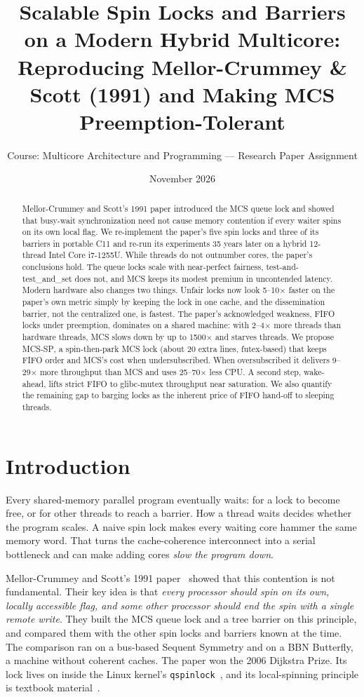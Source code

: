 \documentclass[10pt,twocolumn]{article}
\title{\vspace{-1.2em}\textbf{Scalable Spin Locks and Barriers on a Modern Hybrid Multicore:\\
Reproducing Mellor-Crummey \& Scott (1991) and Making MCS Preemption-Tolerant}\vspace{-0.4em}}
\author{Course: Multicore Architecture and Programming --- Research Paper Assignment}
\date{\vspace{-0.6em}November 2026\vspace{-0.8em}}
\newcommand{\mcssp}{\textsc{MCS-SP}}
\begin{document}
\maketitle

\begin{abstract}
\noindent
Mellor-Crummey and Scott's 1991 paper introduced the MCS queue lock and showed that busy-wait
synchronization need not cause memory contention if every waiter spins on its own local flag. We
re-implement the paper's five spin locks and three of its barriers in portable C11 and re-run its
experiments 35 years later on a hybrid 12-thread Intel Core i7-1255U. While threads do not outnumber
cores, the paper's conclusions hold. The queue locks scale with near-perfect fairness, test-and-test\_and\_set
does not, and MCS keeps its modest premium in uncontended latency. Modern hardware also changes two things.
Unfair locks now look 5--10$\times$ faster on the paper's own metric simply by keeping the lock in one
cache, and the dissemination barrier, not the centralized one, is fastest. The paper's acknowledged weakness,
FIFO locks under preemption, dominates on a shared machine: with 2--4$\times$ more threads than hardware threads, MCS
slows down by up to 1500$\times$ and starves threads. We propose \mcssp{}, a spin-then-park MCS lock
(about 20 extra lines, futex-based) that keeps FIFO order and MCS's cost when undersubscribed. When
oversubscribed it delivers 9--29$\times$ more throughput than MCS and uses 25--70$\times$ less CPU. A second
step, wake-ahead, lifts strict FIFO to glibc-mutex throughput near saturation. We also quantify the remaining gap
to barging locks as the inherent price of FIFO hand-off to sleeping threads.
\end{abstract}

\section{Introduction}
Every shared-memory parallel program eventually waits: for a lock to become free, or for
other threads to reach a barrier. How a thread waits decides whether the program scales. A
naive spin lock makes every waiting core hammer the same memory word. That turns the cache-coherence
interconnect into a serial bottleneck and can make adding cores \emph{slow the program down}.

Mellor-Crummey and Scott's 1991 paper~\cite{mcs91} showed that this contention is
not fundamental. Their key idea is that \emph{every processor should spin on its own, locally
accessible flag, and some other processor should end the spin with a single remote write}. They built
the MCS queue lock and a tree barrier on this principle, and compared them with the other spin
locks and barriers known at the time. The comparison ran on a bus-based Sequent Symmetry and on a BBN
Butterfly, a machine without coherent caches. The paper won the 2006 Dijkstra Prize. Its lock lives on
inside the Linux kernel's \texttt{qspinlock}~\cite{qspinlock}, and its local-spinning principle is
textbook material~\cite{amp}.
\end{document}
